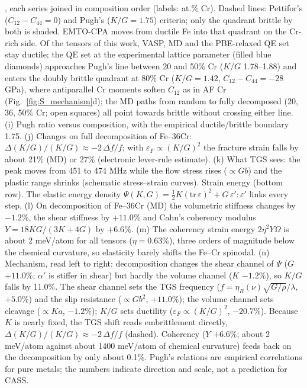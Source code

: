 \documentclass[final,3p,times]{elsarticle}
\begin{document}
{, each series joined in composition order (labels: at.\% Cr). Dashed lines: Pettifor's ($C_{12}-C_{44}=0$) and Pugh's ($K/G=1.75$) criteria; only the quadrant brittle by both is shaded. EMTO-CPA moves from ductile Fe into that quadrant on the Cr-rich side. Of the tensors of this work, VASP, MD and the PBE-relaxed QE set stay ductile; the QE set at the experimental lattice parameter (filled blue diamonds) approaches Pugh's line between 20 and 50\% Cr ($K/G$ 1.78--1.88) and enters the doubly brittle quadrant at 80\% Cr ($K/G=1.42$, $C_{12}-C_{44}=-28$ GPa), where antiparallel Cr moments soften $C_{12}$ as in AF Cr (Fig.~\ref{fig:S_mechanism}d); the MD paths from random to fully decomposed (20, 36, 50\% Cr; open squares) all point towards brittle without crossing either line. (i) Pugh ratio versus composition, with the empirical ductile/brittle boundary 1.75. (j) Changes on full decomposition of Fe--36Cr: $\Delta(K/G)/(K/G)\approx-2\,\Delta f/f$; with $\varepsilon_F\propto(K/G)^2$ the fracture strain falls by about 21\% (MD) or 27\% (electronic lever-rule estimate). (k) What TGS sees: the peak moves from 451 to 474 MHz while the flow stress rises ($\propto Gb$) and the plastic range shrinks (schematic stress--strain curves). Strain energy (bottom row). The elastic energy density $\Psi(K,G)=\frac{1}{2}K(\mathrm{tr}\,\varepsilon)^2+G\,\varepsilon':\varepsilon'$ links every step. (l) On decomposition of Fe--36Cr (MD) the volumetric stiffness changes by $-1.2\%$, the shear stiffness by $+11.0\%$ and Cahn's coherency modulus $Y=18KG/(3K+4G)$ by $+6.6\%$. (m) The coherency strain energy $2\eta^2Y\Omega$ is about 2 meV/atom for all tensors ($\eta=0.63\%$), three orders of magnitude below the chemical curvature, so elasticity barely shifts the Fe--Cr spinodal. (n) Mechanism, read left to right: decomposition changes the shear channel of $\Psi$ ($G$ $+11.0\%$; $\alpha'$ is stiffer in shear) but hardly the volume channel ($K$ $-1.2\%$), so $K/G$ falls by 11.0\%. The shear channel sets the TGS frequency ($f=\eta_R(\nu)\sqrt{G/\rho}/\lambda$, $+5.0\%$) and the slip resistance ($\propto Gb^2$, $+11.0\%$); the volume channel sets cleavage ($\propto Ka$, $-1.2\%$); $K/G$ sets ductility ($\varepsilon_F\propto(K/G)^2$, $-20.7\%$). Because $K$ is nearly fixed, the TGS shift reads embrittlement directly, $\Delta(K/G)/(K/G)\approx-2\,\Delta f/f$ (dashed). Coherency ($Y$ $+6.6\%$; about 2 meV/atom against about 1400 meV/atom of chemical curvature) feeds back on the decomposition by only about 0.1\%. Pugh's relations are empirical correlations for pure metals; the numbers indicate direction and scale, not a prediction for CASS.
}\clearpage
\end{document}
